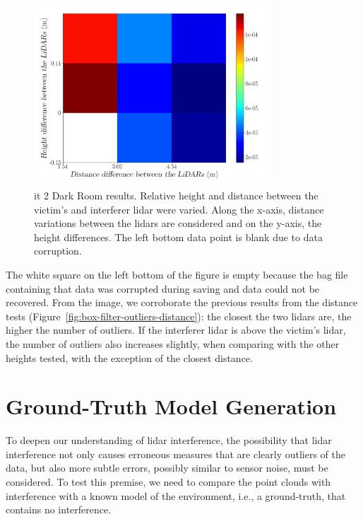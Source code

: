 \begin{figure}[!ht]
\centering
\includegraphics[width=0.8\textwidth]{img/lidar-interference/box-filtering/interference-box-filter-outliers-it2.png}
\caption[Relative number of outliers when the distance and height between the \acsp{lidar} are varied on \acs{it} 2 Dark Room.]{\ac{it} 2 Dark Room results. Relative height and distance between the victim's and interferer \ac{lidar} were varied. Along the x-axis, distance variations between the \acp{lidar} are considered and on the y-axis, the height differences. The left bottom data point is blank due to data corruption.}
\label{fig:box-filter-outliers-it2}
\end{figure}

The white square on the left bottom of the figure is empty because the bag file containing that data was corrupted during saving and data could not be recovered. From the image, we corroborate the previous results from the distance tests (Figure~\ref{fig:box-filter-outliers-distance}): the closest the two \acp{lidar} are, the higher the number of outliers. If the interferer \ac{lidar} is above the victim's \ac{lidar}, the number of outliers also increases slightly, when comparing with the other heights tested, with the exception of the closest distance.





\section{Ground-Truth Model Generation}
\label{sec:lidar-interference:ground-truth-generation}
To deepen our understanding of \ac{lidar} interference, the possibility that \ac{lidar} interference not only causes erroneous measures that are clearly outliers of the data, but also more subtle errors, possibly similar to sensor noise, must be considered. To test this premise, we need to compare the point clouds with interference with a known model of the environment, i.e., a ground-truth, that contains no interference.  

